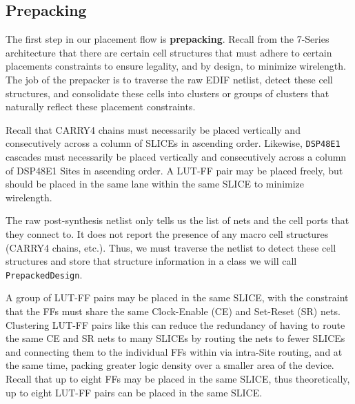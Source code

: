 \begin{multicols}{2}

\subsection{Prepacking}
    \label{subsec:prepacking}


    The first step in our placement flow is \textbf{prepacking}. 
    Recall from the 7-Series architecture that there are certain cell structures that must adhere to certain placements constraints to ensure legality, and by design, to minimize wirelength. 
    The job of the prepacker is to traverse the raw EDIF netlist, detect these cell structures, and consolidate these cells into clusters or groups of clusters that naturally reflect these placement constraints. 

    Recall that CARRY4 chains must necessarily be placed vertically and consecutively across a column of SLICEs in ascending order. 
    Likewise, \texttt{DSP48E1} cascades must necessarily be placed vertically and consecutively across a column of DSP48E1 Sites in ascending order. 
    A LUT-FF pair may be placed freely, but should be placed in the same lane within the same SLICE to minimize wirelength.

    The raw post-synthesis netlist only tells us the list of nets and the cell ports that they connect to. 
    It does not report the presence of any macro cell structures (CARRY4 chains, etc.). 
    Thus, we must traverse the netlist to detect these cell structures and store that structure information in a class we will call \texttt{PrepackedDesign}.

    A group of LUT-FF pairs may be placed in the same SLICE, with the constraint that the FFs must share the same Clock-Enable (CE) and Set-Reset (SR) nets.
    Clustering LUT-FF pairs like this can reduce the redundancy of having to route the same CE and SR nets to many SLICEs by routing the nets to fewer SLICEs and connecting them to the individual FFs within via intra-Site routing, and at the same time, packing greater logic density over a smaller area of the device. 
    Recall that up to eight FFs may be placed in the same SLICE, thus theoretically, up to eight LUT-FF pairs can be placed in the same SLICE. 



\end{multicols}
